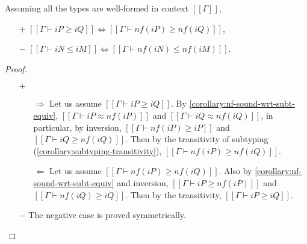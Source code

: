 \begin{corollary} 
  \label{corollary:nf-pres-subt}
  Assuming all the types are well-formed in context $[[Γ]]$,
  \begin{itemize}
    \item [$+$] $[[Γ ⊢ iP ≥ iQ]] \iff [[Γ ⊢ nf(iP) ≥ nf(iQ)]]$,
    \item [$-$] $[[Γ ⊢ iN ≤ iM]] \iff [[Γ ⊢ nf(iN) ≤ nf(iM)]]$.
  \end{itemize}
\end{corollary}
\begin{proof}
  \hfill
  \begin{itemize}
    \item [$+$]  
    \begin{itemize}
      \item [$\Rightarrow$] Let us assume $[[Γ ⊢ iP ≥ iQ]]$.
        By \cref{corollary:nf-sound-wrt-subt-equiv},
        $[[Γ ⊢ iP ≈ nf(iP)]]$ and $[[Γ ⊢ iQ ≈ nf(iQ)]]$, 
        in particular, by inversion, 
        $[[Γ ⊢ nf(iP) ≥ iP]]$ and $[[Γ ⊢ iQ ≥ nf(iQ)]]$.
        Then by the transitivity of subtyping 
        (\cref{corollary:subtyping-transitivity}), 
        $[[Γ ⊢ nf(iP) ≥ nf(iQ)]]$.
      \item [$\Leftarrow$] Let us assume $[[Γ ⊢ nf(iP) ≥ nf(iQ)]]$.
        Also by \cref{corollary:nf-sound-wrt-subt-equiv}
        and inversion, 
        $[[Γ ⊢ iP ≥ nf(iP)]]$ and $[[Γ ⊢ nf(iQ) ≥ iQ]]$.
        Then by the transitivity, $[[Γ ⊢ iP ≥ iQ]]$.
    \end{itemize}
    \item [$-$] The negative case is proved symmetrically.
  \end{itemize}
\end{proof}

